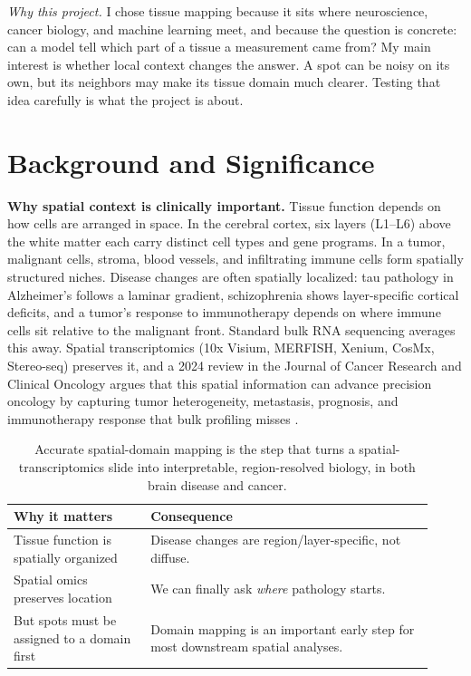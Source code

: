 \documentclass[11pt]{article}
\begin{document}
\vspace{4pt}
\noindent\textit{Why this project.} I chose tissue mapping because it sits where
neuroscience, cancer biology, and machine learning meet, and because the question
is concrete: can a model tell which part of a tissue a measurement came from?
My main interest is whether local context changes the answer. A spot can be noisy
on its own, but its neighbors may make its tissue domain much clearer. Testing
that idea carefully is what the project is about.

\section{Background and Significance}

\textbf{Why spatial context is clinically important.} Tissue function depends on
how cells are arranged in space. In the cerebral cortex, six layers (L1--L6)
above the white matter each carry distinct cell types and gene programs. In a
tumor, malignant cells, stroma, blood vessels, and infiltrating immune cells form
spatially structured niches. Disease changes are often spatially localized: tau
pathology in Alzheimer's follows a laminar gradient, schizophrenia shows
layer-specific cortical deficits, and a tumor's response to immunotherapy depends
on where immune cells sit relative to the malignant front. Standard bulk RNA
sequencing averages this away. Spatial transcriptomics (10x Visium, MERFISH,
Xenium, CosMx, Stereo-seq) preserves it, and a 2024 review in the Journal of
Cancer Research and Clinical Oncology argues that this spatial information can
advance precision oncology by capturing tumor heterogeneity, metastasis,
prognosis, and immunotherapy response that bulk profiling misses
\cite{cilento2024}.

\begin{table}[H]
\centering\small
\begin{tabular}{>{\raggedright\arraybackslash}p{0.30\linewidth} >{\raggedright\arraybackslash}p{0.62\linewidth}}
\toprule
\rowcolor{sriblue}\color{white}\textbf{Why it matters} & \color{white}\textbf{Consequence}\\
\midrule
\rowcolor{srirow} Tissue function is spatially organized & Disease changes are region/layer-specific, not diffuse.\\
Spatial omics preserves location & We can finally ask \emph{where} pathology starts.\\
\rowcolor{srirow} But spots must be assigned to a domain first & Domain mapping is an important early step for most downstream spatial analyses.\\
\bottomrule
\end{tabular}
\caption{Accurate spatial-domain mapping is the step that turns a
spatial-transcriptomics slide into interpretable, region-resolved biology, in
both brain disease and cancer.}
\label{tab:significance}
\end{table}
\end{document}
